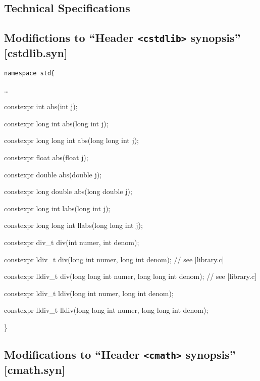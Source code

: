 \documentclass[prd,twocolumn,amsmath,amssymb,nofootinbib,eqsecnum]{revtex4-1}
\newcommand{\code}[1]{{\tt #1}}
\newcommand{\header}[1]{{\tt <#1>}}
\newcommand{\highlight}[1]{{\color{red} #1}}
\begin{document}
\begin{widetext}


\section{Technical Specifications}


\subsection{Modifictions to ``Header \header{cstdlib} synopsis'' [cstdlib.syn]}


\code{namespace std\{

\ldots

\highlight{constexpr} int abs(int j);

\highlight{constexpr}  long int abs(long int j);

\highlight{constexpr}  long long int abs(long long int j);

\highlight{constexpr}  float abs(float j);

\highlight{constexpr} double abs(double j);

\highlight{constexpr} long double abs(long double j);

\vspace{2ex}

\highlight{constexpr} long int labs(long int j);

\highlight{constexpr}  long long int llabs(long long int j);

\vspace{2ex}

\highlight{constexpr} div\_t div(int numer, int denom);

\highlight{constexpr} ldiv\_t div(long int numer, long int denom); // see [library.c]

\highlight{constexpr} lldiv\_t div(long long int numer, long long int denom); // see [library.c]

\highlight{constexpr} ldiv\_t ldiv(long int numer, long int denom);

\highlight{constexpr} lldiv\_t lldiv(long long int numer, long long int denom);	

\}}

\subsection{Modifications to  ``Header \header{cmath} synopsis'' [cmath.syn]}

\code{

}
\end{widetext}
\end{document}
